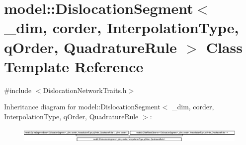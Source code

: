 \hypertarget{classmodel_1_1_dislocation_segment}{}\section{model\+:\+:Dislocation\+Segment$<$ \+\_\+dim, corder, Interpolation\+Type, q\+Order, Quadrature\+Rule $>$ Class Template Reference}
\label{classmodel_1_1_dislocation_segment}


{\ttfamily \#include $<$Dislocation\+Network\+Traits.\+h$>$}

Inheritance diagram for model\+:\+:Dislocation\+Segment$<$ \+\_\+dim, corder, Interpolation\+Type, q\+Order, Quadrature\+Rule $>$\+:\begin{figure}[H]
\begin{center}
\leavevmode
\includegraphics[height=0.759837cm]{classmodel_1_1_dislocation_segment}
\end{center}
\end{figure}
